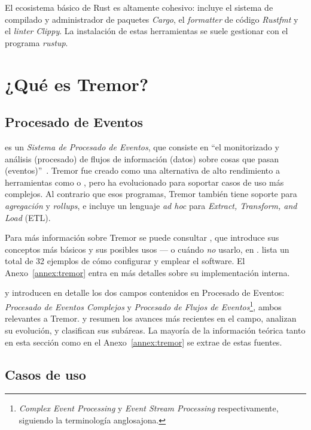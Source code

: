 El ecosistema básico de Rust es altamente cohesivo: incluye el sistema de
compilado y administrador de paquetes \emph{Cargo}, el \emph{formatter} de
código \emph{Rustfmt} y el \emph{linter} \emph{Clippy}. La instalación de estas
herramientas se suele gestionar con el programa \emph{rustup}.

\section{¿Qué es Tremor?}\label{sec:tremor}

\subsection{Procesado de Eventos}

 es un \emph{Sistema de Procesado de Eventos}, que consiste en
``el monitorizado y análisis (procesado) de flujos de información (datos) sobre
cosas que pasan (eventos)''~\cite{luckham2011event}. Tremor fue creado como una
alternativa de alto rendimiento a herramientas como  o
, pero ha evolucionado para soportar casos de uso más
complejos. Al contrario que esos programas, Tremor también tiene soporte para
\emph{agregación} y \emph{rollups}, e incluye un lenguaje \emph{ad hoc} para
\emph{Extract, Transform, and Load} (ETL).

Para más información sobre Tremor se puede consultar ,
que introduce sus conceptos más básicos y sus posibles usos --- o cuándo
\emph{no} usarlo, en . 
lista un total de 32 ejemplos de cómo configurar y emplear el software. El
Anexo~\ref{annex:tremor} entra en más detalles sobre su implementación interna.

\textcite{robins2010complex} y \textcite{cugola2012processing} introducen en
detalle los dos campos contenidos en Procesado de Eventos: \emph{Procesado de
Eventos Complejos} y \emph{Procesado de Flujos de
Eventos}\footnote{\emph{Complex Event Processing} y \emph{Event Stream
Processing} respectivamente, siguiendo la terminología anglosajona.}, ambos
relevantes a Tremor. \textcite{dayarathna2018recent} y
\textcite{tawsif2018review} resumen los avances más recientes en el campo,
analizan su evolución, y clasifican sus subáreas. La mayoría de la información
teórica tanto en esta sección como en el Anexo~\ref{annex:tremor} se extrae de
estas fuentes.

\subsection{Casos de uso}

